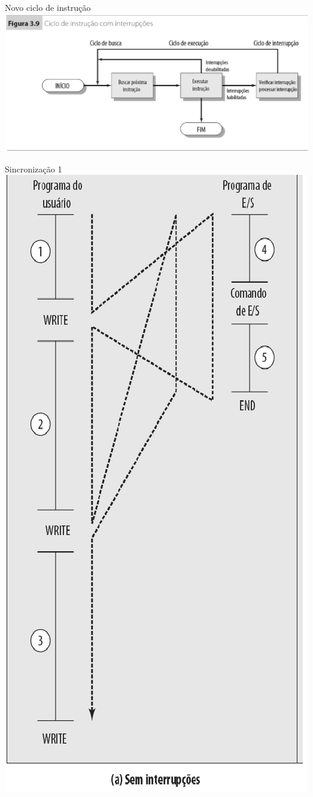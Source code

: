 \begin{slide}{Novo ciclo de instrução}
   \centering
   \includegraphics[width=\textwidth]{figs/int_ciclo.eps}
\end{slide}

\begin{slide}{Sincronização 1}
   \centering
   \includegraphics[height=0.8\textheight]{figs/int01.eps}

\end{slide}
